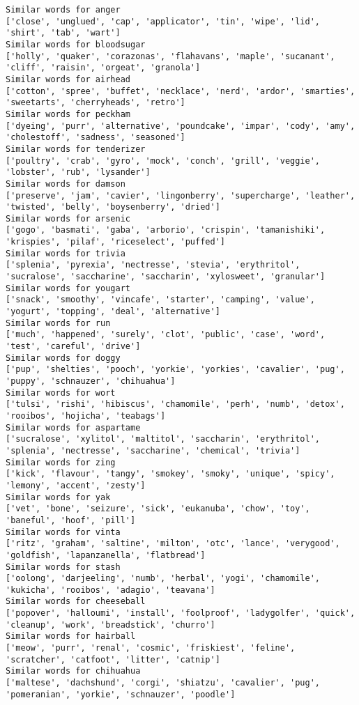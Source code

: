\documentclass[11pt]{article}
\begin{document}
\begin{Verbatim}[commandchars=\\\{\}]
Similar words for anger
['close', 'unglued', 'cap', 'applicator', 'tin', 'wipe', 'lid', 'shirt', 'tab', 'wart']
Similar words for bloodsugar
['holly', 'quaker', 'corazonas', 'flahavans', 'maple', 'sucanant', 'cliff', 'raisin', 'orgeat', 'granola']
Similar words for airhead
['cotton', 'spree', 'buffet', 'necklace', 'nerd', 'ardor', 'smarties', 'sweetarts', 'cherryheads', 'retro']
Similar words for peckham
['dyeing', 'purr', 'alternative', 'poundcake', 'impar', 'cody', 'amy', 'cholestoff', 'sadness', 'seasoned']
Similar words for tenderizer
['poultry', 'crab', 'gyro', 'mock', 'conch', 'grill', 'veggie', 'lobster', 'rub', 'lysander']
Similar words for damson
['preserve', 'jam', 'cavier', 'lingonberry', 'supercharge', 'leather', 'twisted', 'belly', 'boysenberry', 'dried']
Similar words for arsenic
['gogo', 'basmati', 'gaba', 'arborio', 'crispin', 'tamanishiki', 'krispies', 'pilaf', 'riceselect', 'puffed']
Similar words for trivia
['splenia', 'pyrexia', 'nectresse', 'stevia', 'erythritol', 'sucralose', 'saccharine', 'saccharin', 'xylosweet', 'granular']
Similar words for yougart
['snack', 'smoothy', 'vincafe', 'starter', 'camping', 'value', 'yogurt', 'topping', 'deal', 'alternative']
Similar words for run
['much', 'happened', 'surely', 'clot', 'public', 'case', 'word', 'test', 'careful', 'drive']
Similar words for doggy
['pup', 'shelties', 'pooch', 'yorkie', 'yorkies', 'cavalier', 'pug', 'puppy', 'schnauzer', 'chihuahua']
Similar words for wort
['tulsi', 'rishi', 'hibiscus', 'chamomile', 'perh', 'numb', 'detox', 'rooibos', 'hojicha', 'teabags']
Similar words for aspartame
['sucralose', 'xylitol', 'maltitol', 'saccharin', 'erythritol', 'splenia', 'nectresse', 'saccharine', 'chemical', 'trivia']
Similar words for zing
['kick', 'flavour', 'tangy', 'smokey', 'smoky', 'unique', 'spicy', 'lemony', 'accent', 'zesty']
Similar words for yak
['vet', 'bone', 'seizure', 'sick', 'eukanuba', 'chow', 'toy', 'baneful', 'hoof', 'pill']
Similar words for vinta
['ritz', 'graham', 'saltine', 'milton', 'otc', 'lance', 'verygood', 'goldfish', 'lapanzanella', 'flatbread']
Similar words for stash
['oolong', 'darjeeling', 'numb', 'herbal', 'yogi', 'chamomile', 'kukicha', 'rooibos', 'adagio', 'teavana']
Similar words for cheeseball
['popover', 'halloumi', 'install', 'foolproof', 'ladygolfer', 'quick', 'cleanup', 'work', 'breadstick', 'churro']
Similar words for hairball
['meow', 'purr', 'renal', 'cosmic', 'friskiest', 'feline', 'scratcher', 'catfoot', 'litter', 'catnip']
Similar words for chihuahua
['maltese', 'dachshund', 'corgi', 'shiatzu', 'cavalier', 'pug', 'pomeranian', 'yorkie', 'schnauzer', 'poodle']

\end{Verbatim}
\end{document}
